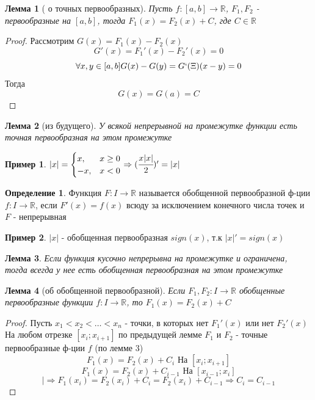 \documentclass[a4paper]{article}
\newtheorem{lemma}{Лемма}
\theoremstyle{definition}
\newtheorem*{definition*}{Определение}
\newtheorem*{exmp}{Пример}
\newcommand\abs[1]{%
\mbox{$| #1 |$}}
\numberwithin{theorem}{subsection}
\numberwithin{lemma}{subsection}
\numberwithin{definition}{subsection}
\numberwithin{comment*}{subsection}
\numberwithin{consequence}{subsection}
\numberwithin{property}{subsection}
\begin{document}
\begin{lemma}[ о точных первообразных]
 Пусть $f: [a,b] \rightarrow \mathbb{R}$, $F_1, F_2$ - первообразные на $[a,b]$, тогда $F_1(x)=F_2(x)+C$, где $C \in \mathbb{R}$
\end{lemma}
\begin{proof}
 Рассмотрим $G(x) = F_1(x) - F_2(x)$
 $$ G'(x) = F_1'(x) - F_2'(x) = 0 $$
 $$ \forall{x,y} \in [a,b] G(x) - G(y)=G`(\Xi)(x-y) = 0$$
 Тогда $$G(x)=G(a) = C$$
\end{proof}
\begin{lemma}[из будущего]
 У всякой непрерывной на промежутке функции есть точная первообразная на этом промежутке
\end{lemma}
\begin{exmp}
 $\abs{x} = \begin{cases}
   x,  & x\geq 0 \\
   -x, & x<0     \\
  \end{cases} \Rightarrow
  (\cfrac{x\abs{x}}{2})'=\abs{x}
 $
\end{exmp}
\begin{definition*}
 Функция $F: I \rightarrow \mathbb{R}$ называется обобщенной первообразной ф-ции $f: I \rightarrow \mathbb{R}$, если $F'(x) = f(x)$ всюду за исключением конечного числа точек и $F$ - непрерывная
\end{definition*}
\begin{exmp}
 $\abs{x}$ - обобщенная первообразная $sign(x)$, т.к $\abs{x}'=sign(x)$
\end{exmp}
\begin{lemma}
 Если функция кусочно непрерывна на промежутке и ограничена, тогда всегда у нее есть обобщенная первообразная на этом промежутке
\end{lemma}
\begin{lemma}[об обобщенной первообразной]
 Если $F_1, F_2: I \rightarrow \mathbb{R}$ обобщенные первообразные функции $f: I \rightarrow \mathbb{R}$, то $F_1(x)= F_2(x)+C$
\end{lemma}
\begin{proof}
 Пусть $x_1<x_2< \dots < x_n$ - точки, в которых нет $F_1'(x)$ или нет $F_2'(x)$\\
 На любом отрезке  $[x_i; x_{i+1}]$ по предыдущей лемме  $F_1$ и $F_2$ - точные первообразные ф-ции $f$ (по лемме 3)\\
 $$ F_1(x)=F_2(x) + C_i  \text{ На }[x_i; x_{i+1}]$$
 $$ F_1(x)=F_2(x) + C_{i-1} \text{ На }[x_{i-1}; x_{i}]$$
 $$|\Rightarrow F_1(x_i)= F_2(x_i) + C_i = F_2(x_i) + C_{i-1} \Rightarrow C_i = C_{i-1}$$
\end{proof}
\end{document}
